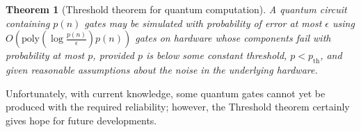 \documentclass{article}
\newtheorem{theorem}{Theorem}
\begin{document}
\begin{theorem}[Threshold theorem for quantum computation]
	A quantum circuit containing $p(n)$ gates may be simulated with probability of error
	at most $\epsilon$ using $O\left(\text{poly}\left(\log \frac{p(n)}{\epsilon}\right)p(n)\right)$
	gates on hardware whose components fail with probability at most $p$, provided $p$ is
	below some constant threshold, $p < p_{\text{th}}$, and given reasonable assumptions about
	the noise in the underlying hardware.
\end{theorem}

\noindent Unfortunately, with current knowledge, some quantum gates cannot yet be produced with
the required reliability;
however, the Threshold theorem certainly gives hope for future developments.



\end{document}
